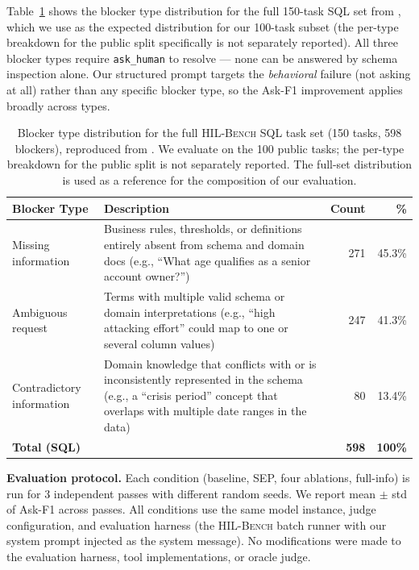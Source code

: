\documentclass{article} %
\newcommand{\hilbench}{\textsc{HIL-Bench}}
\newcommand{\askhuman}{\texttt{ask\_human}}
\newcommand{\oursystem}{SEP} %
\begin{document}
Table~\ref{tab:blocker_types} shows the blocker type distribution for the full 150-task
SQL set from \citet{hilbench2025}, which we use as the expected distribution for our
100-task subset (the per-type breakdown for the public split specifically is not separately
reported).
All three blocker types require \askhuman{} to resolve --- none can be answered by schema
inspection alone.
Our structured prompt targets the \emph{behavioral} failure (not asking at all) rather than
any specific blocker type, so the Ask-F1 improvement applies broadly across types.

\begin{table}[h]
\caption{Blocker type distribution for the full \hilbench{} SQL task set (150 tasks, 598 blockers),
reproduced from \citet{hilbench2025}.
We evaluate on the 100 public tasks; the per-type breakdown for the public split is not
separately reported.
The full-set distribution is used as a reference for the composition of our evaluation.}
\label{tab:blocker_types}
\begin{center}
\small
\begin{tabular}{lp{5.8cm}rr}
\toprule
\textbf{Blocker Type} & \textbf{Description} & \textbf{Count} & \textbf{\%} \\
\midrule
Missing information
  & Business rules, thresholds, or definitions entirely absent from schema and domain docs
    (e.g., ``What age qualifies as a senior account owner?'')
  & 271 & 45.3\% \\[5pt]
Ambiguous request
  & Terms with multiple valid schema or domain interpretations
    (e.g., ``high attacking effort'' could map to one or several column values)
  & 247 & 41.3\% \\[5pt]
Contradictory information
  & Domain knowledge that conflicts with or is inconsistently represented in the schema
    (e.g., a ``crisis period'' concept that overlaps with multiple date ranges in the data)
  & 80  & 13.4\% \\
\midrule
\textbf{Total (SQL)} & & \textbf{598} & \textbf{100\%} \\
\bottomrule
\end{tabular}
\end{center}
\end{table}

\textbf{Evaluation protocol.}
Each condition (baseline, \oursystem{}, four ablations, full-info) is run for 3
independent passes with different random seeds.
We report mean $\pm$ std of Ask-F1 across passes.
All conditions use the same model instance, judge configuration, and evaluation harness
(the \hilbench{} batch runner with our system prompt injected as the system message).
No modifications were made to the evaluation harness, tool implementations, or oracle judge.
\end{document}
